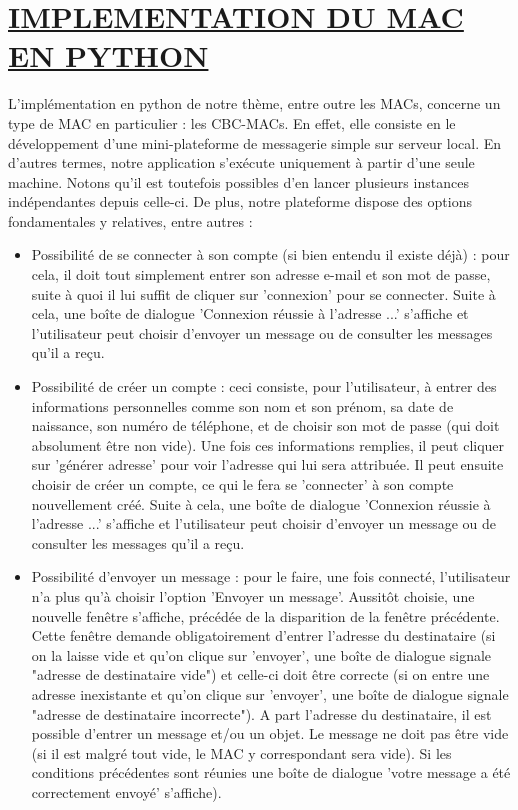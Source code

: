 \section{\textbf{\underline{IMPLEMENTATION DU MAC EN PYTHON}}}

L'implémentation en python de notre thème, entre outre les MACs, concerne un type de MAC en particulier : les CBC-MACs. En effet, elle consiste en le développement d'une mini-plateforme de messagerie simple sur serveur local. En d'autres termes, notre application s'exécute uniquement à partir d'une seule machine. Notons qu'il est toutefois possibles d'en lancer plusieurs instances indépendantes depuis celle-ci. De plus, notre plateforme dispose des options fondamentales y relatives, entre autres :
\begin{itemize}[label=$\cdot$]
    \item Possibilité de se connecter à son compte (si bien entendu il existe déjà) : pour cela, il doit tout simplement entrer son adresse e-mail et son mot de passe, suite à quoi il lui suffit de cliquer sur 'connexion' pour se connecter. Suite à cela, une boîte de dialogue 'Connexion réussie à l'adresse ...' s'affiche et l'utilisateur peut choisir d'envoyer un message ou de consulter les messages qu'il a reçu.
    \item Possibilité de créer un compte : ceci consiste, pour l'utilisateur, à entrer des informations personnelles comme son nom et son prénom, sa date de naissance, son numéro de téléphone, et de choisir son mot de passe (qui doit absolument être non vide). Une fois ces informations remplies, il peut cliquer sur 'générer adresse' pour voir l'adresse qui lui sera attribuée. Il peut ensuite choisir de créer un compte, ce qui le fera se 'connecter' à son compte nouvellement créé. Suite à cela, une boîte de dialogue 'Connexion réussie à l'adresse ...' s'affiche et l'utilisateur peut choisir d'envoyer un message ou de consulter les messages qu'il a reçu.
    \item Possibilité d'envoyer un message : pour le faire, une fois connecté, l'utilisateur n'a plus qu'à choisir l'option 'Envoyer un message'. Aussitôt choisie, une nouvelle fenêtre s'affiche, précédée de la disparition de la fenêtre précédente. Cette fenêtre demande obligatoirement d'entrer l'adresse du destinataire (si on la laisse vide et qu'on clique sur 'envoyer', une boîte de dialogue signale "adresse de destinataire vide") et celle-ci doit être correcte (si on entre une adresse inexistante et qu'on clique sur 'envoyer', une boîte de dialogue signale "adresse de destinataire incorrecte"). A part l'adresse du destinataire, il est possible d'entrer un message et/ou un objet. Le message ne doit pas être vide (si il est malgré tout vide, le MAC y correspondant sera vide). Si les conditions précédentes sont réunies une boîte de dialogue 'votre message a été correctement envoyé' s'affiche).

\end{itemize}
